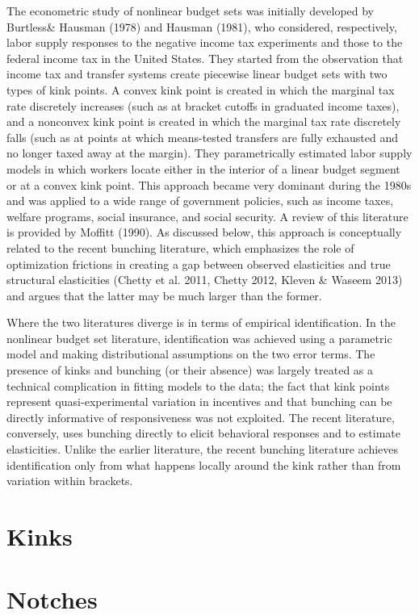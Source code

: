\documentclass[11pt]{book}%
\begin{document}
The econometric study of nonlinear budget sets was initially developed by Burtless\& Hausman (1978) and Hausman (1981), who considered, respectively, labor supply responses to the negative income tax experiments and those to the federal income tax in the United States. They started from the observation that income tax and transfer systems create piecewise linear budget sets with two types of kink points. A convex kink point is created in which the marginal tax rate discretely increases (such as at bracket cutoffs in graduated income taxes), and a nonconvex kink point is created in which the marginal tax rate discretely falls (such as at points at which means-tested transfers are fully exhausted and no longer taxed away at the margin).  They parametrically estimated labor supply models in which workers locate either in the interior of a linear budget segment or at a convex kink point. This approach became very dominant during the 1980s and was applied to a wide range of government policies, such as income taxes, welfare programs, social insurance, and social security. A review of this literature is provided by Moffitt (1990). As discussed below, this approach is conceptually related to the recent bunching literature, which emphasizes the role of optimization frictions in creating a gap between observed elasticities and true structural elasticities (Chetty et al. 2011, Chetty 2012, Kleven \& Waseem 2013) and argues that the latter may be much larger than the former. 

Where the two literatures diverge is in terms of empirical identification. In the nonlinear budget set literature, identification was achieved using a parametric model and making distributional assumptions on the two error terms. The presence of kinks and bunching (or their absence) was largely treated as a technical complication in fitting models to the data; the fact that kink points represent quasi-experimental variation in incentives and that bunching can be directly informative of responsiveness was not exploited. The recent literature, conversely, uses bunching directly to elicit behavioral responses and to estimate elasticities. Unlike the earlier literature, the recent bunching literature achieves identification only from what happens locally around the kink rather than from variation within brackets.

\section{Kinks}




\section{Notches}


\newpage 
%

\end{document}
